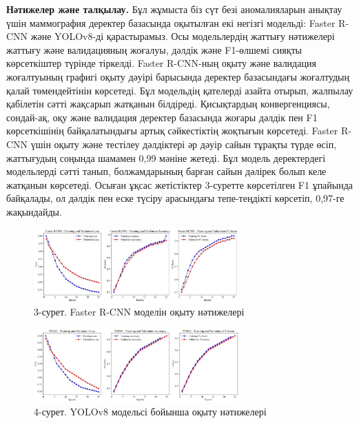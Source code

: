 \begin{multicols}{2}
{\bfseries Нәтижелер және талқылау.} Бұл жұмыста біз сүт безі аномалияларын
анықтау үшін маммография деректер базасында оқытылған екі негізгі
модельді: Faster R-CNN және YOLOv8-ді қарастырамыз. Осы модельлердің
жаттығу нәтижелері жаттығу және валидацияның жоғалуы, дәлдік және
F1-өлшемі сияқты көрсеткіштер түрінде тіркелді. Faster R-CNN-ның оқыту
және валидация жоғалтуының графигі оқыту дәуірі барысында деректер
базасындағы жоғалтудың қалай төмендейтінін көрсетеді. Бұл модельдің
қателерді азайта отырып, жалпылау қабілетін сәтті жақсарып жатқанын
білдіреді. Қисықтардың конвергенциясы, сондай-ақ, оқу және валидация
деректер базасында жоғары дәлдік пен F1 көрсеткішінің байқалатындығы
артық сәйкестіктің жоқтығын көрсетеді. Faster R-CNN үшін оқыту және
тестілеу дәлдіктері әр дәуір сайын тұрақты түрде өсіп, жаттығудың
соңында шамамен 0,99 мәніне жетеді. Бұл модель деректердегі модельлерді
сәтті танып, болжамдарының барған сайын дәлірек болып келе жатқанын
көрсетеді. Осыған ұқсас жетістіктер 3-суретте көрсетілген F1 ұпайында
байқалады, ол дәлдік пен еске түсіру арасындағы тепе-теңдікті көрсетіп,
0,97-ге жақындайды.
\end{multicols}

\begin{figure}[H]
	\centering
	\includegraphics[width=0.7\textwidth]{media/ict/image25}
	\caption*{3-сурет. Faster R-CNN моделін оқыту нәтижелері}
\end{figure}

\begin{figure}[H]
	\centering
	\includegraphics[width=0.7\textwidth]{media/ict/image26}
	\caption*{4-сурет. YOLOv8 модельсі бойынша оқыту нәтижелері}
\end{figure}

